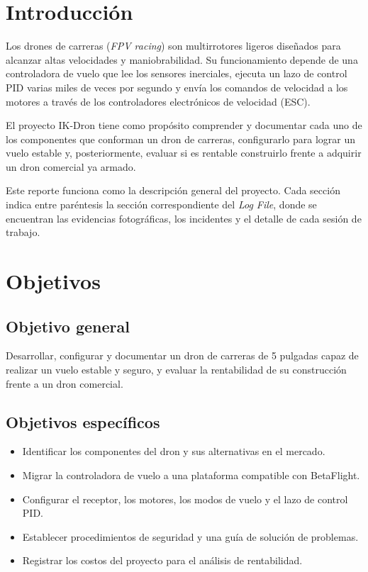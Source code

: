\documentclass[11pt,letterpaper]{article}
\begin{document}
\tableofcontents
\newpage

\section{Introducción}
Los drones de carreras (\textit{FPV racing}) son multirrotores ligeros diseñados para alcanzar altas velocidades y maniobrabilidad. Su funcionamiento depende de una controladora de vuelo que lee los sensores inerciales, ejecuta un lazo de control PID varias miles de veces por segundo y envía los comandos de velocidad a los motores a través de los controladores electrónicos de velocidad (ESC).

El proyecto IK-Dron tiene como propósito comprender y documentar cada uno de los componentes que conforman un dron de carreras, configurarlo para lograr un vuelo estable y, posteriormente, evaluar si es rentable construirlo frente a adquirir un dron comercial ya armado.

Este reporte funciona como la descripción general del proyecto. Cada sección indica entre paréntesis la sección correspondiente del \textit{Log File}, donde se encuentran las evidencias fotográficas, los incidentes y el detalle de cada sesión de trabajo.

\section{Objetivos}
\subsection{Objetivo general}
Desarrollar, configurar y documentar un dron de carreras de 5 pulgadas capaz de realizar un vuelo estable y seguro, y evaluar la rentabilidad de su construcción frente a un dron comercial.

\subsection{Objetivos específicos}
\begin{itemize}[nosep]
    \item Identificar los componentes del dron y sus alternativas en el mercado.
    \item Migrar la controladora de vuelo a una plataforma compatible con BetaFlight.
    \item Configurar el receptor, los motores, los modos de vuelo y el lazo de control PID.
    \item Establecer procedimientos de seguridad y una guía de solución de problemas.
    \item Registrar los costos del proyecto para el análisis de rentabilidad.
\end{itemize}
\end{document}
